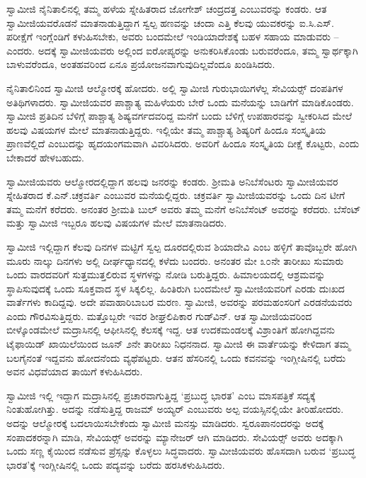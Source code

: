  ಸ್ವಾಮೀಜಿ ನೈನಿತಾಲಿನಲ್ಲಿ ತಮ್ಮ ಹಳೆಯ ಸ್ನೇಹಿತರಾದ ಜೋಗೇಶ್ ಚಂದ್ರದತ್ತ ಎಂಬುವರನ್ನು ಕಂಡರು. ಆತ ಸ್ವಾಮೀಜಿಯವರೊಡನೆ ಮಾತನಾಡುತ್ತಿದ್ದಾಗ ಸ್ವಲ್ಪ ಹಣವನ್ನು ಚಂದಾ ಎತ್ತಿ ಕೆಲವು ಯುವಕರನ್ನು ಐ.ಸಿ.ಎಸ್. ಪರೀಕ್ಷೆಗೆ ಇಂಗ್ಲೆಂಡಿಗೆ ಕಳುಹಿಸಬೇಕು, ಅವರು ಬಂದಮೇಲೆ ಇಂಡಿಯಾದೇಶಕ್ಕೆ ಬಹಳ ಸಹಾಯ ಮಾಡುವರು – ಎಂದರು. ಅದಕ್ಕೆ ಸ್ವಾಮೀಜಿಯವರು ಅಲ್ಲಿಂದ ಐರೋಪ್ಯರನ್ನು ಅನುಕರಿಸಿಕೊಂಡು ಬರುವರೆಂದೂ, ತಮ್ಮ ಸ್ವಾರ್ಥಕ್ಕಾಗಿ ಬಾಳುವರೆಂದೂ, ಅಂತಹವರಿಂದ ಏನೂ ಪ್ರಯೋಜನವಾಗುವುದಿಲ್ಲವೆಂದೂ ಖಂಡಿಸಿದರು. 

 ನೈನಿತಾಲಿನಿಂದ ಸ್ವಾಮೀಜಿ ಆಲ್ಮೋರಕ್ಕೆ ಹೋದರು. ಅಲ್ಲಿ ಸ್ವಾಮೀಜಿ ಗುರುಭಾಯಿಗಳೆಲ್ಲ ಸೇವಿಯರ್ಸ್‍‍ ದಂಪತಿಗಳ ಅತಿಥಿಗಳಾದರು. ಸ್ವಾಮೀಜಿಯವರ ಪಾಶ್ಚಾತ್ಯ ಮಹಿಳೆಯರು ಬೇರೆ ಒಂದು ಮನೆಯನ್ನು ಬಾಡಿಗೆಗೆ ಮಾಡಿಕೊಂಡರು. ಸ್ವಾಮೀಜಿ ಪ್ರತಿದಿನ ಬೆಳಿಗ್ಗೆ ಪಾಶ್ಚಾತ್ಯ ಶಿಷ್ಯವರ್ಗದವರಿದ್ದ ಮನೆಗೆ ಬಂದು ಬೆಳಿಗ್ಗೆ ಉಪಹಾರವನ್ನು ಸ್ವೀಕರಿಸಿದ ಮೇಲೆ ಹಲವು ವಿಷಯಗಳ ಮೇಲೆ ಮಾತನಾಡುತ್ತಿದ್ದರು. ಇಲ್ಲಿಯೇ ತಮ್ಮ ಪಾಶ್ಚಾತ್ಯ ಶಿಷ್ಯರಿಗೆ ಹಿಂದೂ ಸಂಸ್ಕೃತಿಯ ಪ್ರಾಣವೆಲ್ಲಿದೆ ಎಂಬುದನ್ನು ಹೃದಯಂಗಮವಾಗಿ ವಿವರಿಸಿದರು. ಅವರಿಗೆ ಹಿಂದೂ ಸಂಸ್ಕೃತಿಯ ದೀಕ್ಷೆ ಕೊಟ್ಟರು, ಎಂದು ಬೇಕಾದರೆ ಹೇಳಬಹುದು. 

 ಸ್ವಾಮೀಜಿಯವರು ಆಲ್ಮೋರದಲ್ಲಿದ್ದಾಗ ಹಲವು ಜನರನ್ನು ಕಂಡರು. ಶ‍್ರೀಮತಿ ಅನಿಬೆಸೆಂಟರು ಸ್ವಾಮೀಜಿಯವರ ಸ್ನೇಹಿತರಾದ ಕೆ.ಎನ್.ಚಕ್ರವರ್ತಿ ಎಂಬುವರ ಮನೆಯಲ್ಲಿದ್ದರು. ಚಕ್ರವರ್ತಿ ಸ್ವಾಮೀಜಿಯವರನ್ನು ಒಂದು ದಿನ ಟೀಗೆ ತಮ್ಮ ಮನೆಗೆ ಕರೆದರು. ಅನಂತರ ಶ‍್ರೀಮತಿ ಬುಲ್ ಅವರು ತಮ್ಮ ಮನೆಗೆ ಅನಿಬೆಸೆಂಟ್ ಅವರನ್ನು ಕರೆದರು. ಬೆಸೆಂಟ್ ಮತ್ತು ಸ್ವಾಮೀಜಿ ಇಬ್ಬರೂ ಹಲವು ವಿಷಯಗಳ ಮೇಲೆ ಮಾತನಾಡಿದರು. 

 ಸ್ವಾಮೀಜಿ ಇಲ್ಲಿದ್ದಾಗ ಕೆಲವು ದಿನಗಳ ಮಟ್ಟಿಗೆ ಸ್ವಲ್ಪ ದೂರದಲ್ಲಿರುವ ಶಿಯಾದೇವಿ ಎಂಬ ಹಳ್ಳಿಗೆ ತಾವೊಬ್ಬರೇ ಹೋಗಿ ಮೂರು ನಾಲ್ಕು ದಿನಗಳು ಅಲ್ಲಿ ದೀರ್ಘಧ್ಯಾನದಲ್ಲಿ ಕಳೆದು ಬಂದರು. ಅನಂತರ ಮೇ ೩೦ನೇ ತಾರೀಖು ಸುಮಾರು ಒಂದು ವಾರದವರಿಗೆ ಸುತ್ತಮುತ್ತಲಿರುವ ಸ್ಥಳಗಳನ್ನು ನೋಡಿ ಬರುತ್ತಿದ್ದರು. ಹಿಮಾಲಯದಲ್ಲಿ ಆಶ್ರಮವನ್ನು ಸ್ಥಾಪಿಸುವುದಕ್ಕೆ ಒಂದು ಸೂಕ್ತವಾದ ಸ್ಥಳ ಸಿಕ್ಕಲಿಲ್ಲ. ಹಿಂತಿರುಗಿ ಬಂದಮೇಲೆ ಸ್ವಾಮೀಜಿಯವರಿಗೆ ಎರಡು ದುಃಖದ ವಾರ್ತೆಗಳು ಕಾದಿದ್ದವು. ಅದೇ ಪವಾಹಾರಿಬಾಬರ ಮರಣ. ಸ್ವಾಮೀಜಿ, ಅವರನ್ನು ಪರಮಹಂಸರಿಗೆ ಎರಡನೆಯವರು ಎಂದು ಗೌರವಿಸುತ್ತಿದ್ದರು. ಮತ್ತೊಬ್ಬರೇ ಇವರ ಶೀಘ್ರಲಿಪಿಕಾರ ಗುಡ್‍ವಿನ್. ಆತ ಸ್ವಾಮೀಜಿಯವರಿಂದ ಬೀಳ್ಕೊಂಡಮೇಲೆ ಮದ್ರಾಸಿನಲ್ಲಿ  ಆಫೀಸಿನಲ್ಲಿ ಕೆಲಸಕ್ಕೆ ಇದ್ದ. ಆತ ಉದಕಮಂಡಲಕ್ಕೆ ವಿಶ್ರಾಂತಿಗೆ ಹೋಗಿದ್ದವನು ಟೈಫಾಯಿಡ್ ಖಾಯಿಲೆಯಿಂದ ಜೂನ್ ೨ನೇ ತಾರೀಖು ನಿಧನನಾದ. ಸ್ವಾಮೀಜಿ ಈ ವಾರ್ತೆಯನ್ನು ಕೇಳಿದಾಗ ತಮ್ಮ ಬಲಗೈನಂತೆ ಇದ್ದವನು ಹೋದನೆಂದು ವ್ಯಥೆಪಟ್ಟರು. ಆತನ ಹೆಸರಿನಲ್ಲಿ ಒಂದು ಕವನವನ್ನು ಇಂಗ್ಲೀಷಿನಲ್ಲಿ ಬರೆದು ಅವನ ವಿಧವೆಯಾದ ತಾಯಿಗೆ ಕಳುಹಿಸಿದರು. 

 ಸ್ವಾಮೀಜಿ ಇಲ್ಲಿ ಇದ್ದಾಗ ಮದ್ರಾಸಿನಲ್ಲಿ ಪ್ರಚಾರವಾಗುತ್ತಿದ್ದ ‘ಪ್ರಬುದ್ಧ ಭಾರತ’ ಎಂಬ ಮಾಸಪತ್ರಿಕೆ ಸದ್ಯಕ್ಕೆ ನಿಂತುಹೋಗಿತ್ತು. ಅದನ್ನು ನಡೆಸುತ್ತಿದ್ದ ರಾಜಮ್ ಅಯ್ಯರ್ ಎಂಬುವರು ಅಲ್ಪ ವಯಸ್ಸಿನಲ್ಲಿಯೇ ತೀರಿಹೋದರು. ಅದನ್ನು ಆಲ್ಮೋರಕ್ಕೆ ಬದಲಾಯಿಸಬೇಕೆಂದು ಸ್ವಾಮೀಜಿ ಮನಸ್ಸು ಮಾಡಿದರು. ಸ್ವರೂಪಾನಂದರನ್ನು ಅದಕ್ಕೆ ಸಂಪಾದಕರನ್ನಾಗಿ ಮಾಡಿ, ಸೇವಿಯರ್ಸ್‍‍ ಅವರನ್ನು ಮ್ಯಾನೇಜರ್ ಆಗಿ ಮಾಡಿದರು. ಸೇವಿಯರ್ಸ್‍‍ ಅವರು ಅದಕ್ಕಾಗಿ ಒಂದು ಸಣ್ಣ ಕೈಯಿಂದ ನಡೆಸುವ ಪ್ರೆಸ್ಸನ್ನು ಕೊಳ್ಳಲು ಸಿದ್ಧವಾದರು. ಸ್ವಾಮೀಜಿಯವರು ಹೊಸದಾಗಿ ಬರುವ ‘ಪ್ರಬುದ್ಧ ಭಾರತ’ಕ್ಕೆ ಇಂಗ್ಲೀಷಿನಲ್ಲಿ ಒಂದು ಪದ್ಯವನ್ನು ಬರೆದು ಹರಸಿಕಳುಹಿಸಿದರು. 

